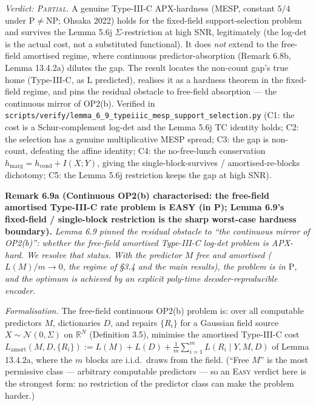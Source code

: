 \documentclass[
]{article}
\begin{document}
\emph{Verdict: \textsc{Partial}.} A genuine Type-III-C APX-hardness (MESP,
constant $5/4$ under $\mathrm P\neq\mathrm{NP}$; Ohsaka 2022) holds for the
fixed-field support-selection problem and survives the Lemma 5.6j
$\Sigma$-restriction at high SNR, legitimately (the log-det is the actual
cost, not a substituted functional). It does \emph{not} extend to the
free-field amortised regime, where continuous predictor-absorption (Remark
6.8b, Lemma 13.4.2a) dilutes the gap. The result locates the non-count gap's
true home (Type-III-C, as L predicted), realises it as a hardness theorem in
the fixed-field regime, and pins the residual obstacle to free-field
absorption --- the continuous mirror of OP2(b). Verified in
\texttt{scripts/verify/lemma\_6\_9\_typeiiic\_mesp\_support\_selection.py}
(C1: the cost is a Schur-complement log-det and the Lemma 5.6j TC identity
holds; C2: the selection has a genuine multiplicative MESP spread; C3: the
gap is non-count, defeating the affine identity; C4: the no-free-lunch
conservation $h_{\mathrm{marg}}=h_{\mathrm{cond}}+I(X;Y)$, giving the
single-block-survives / amortised-re-blocks dichotomy; C5: the Lemma 5.6j
restriction keeps the gap at high SNR).

\textbf{Remark 6.9a (Continuous OP2(b) characterised: the free-field
amortised Type-III-C rate problem is EASY (in P); Lemma 6.9's fixed-field /
single-block restriction is the sharp worst-case hardness boundary).}
\emph{Lemma 6.9 pinned the residual obstacle to ``the continuous mirror of
OP2(b)'': whether the free-field amortised Type-III-C log-det problem is
APX-hard. We resolve that status. With the predictor $M$ free and amortised
($L(M)/m\to0$, the regime of \S 3.4 and the main results), the problem is in
$\mathrm P$, and the optimum is achieved by an explicit poly-time
decoder-reproducible encoder.}

\emph{Formalisation.} The free-field continuous OP2(b) problem is: over all
computable predictors $M$, dictionaries $D$, and repairs $\{R_i\}$ for a
Gaussian field source $X\sim\mathcal N(0,\Sigma)$ on $\mathbb R^N$
(Definition 3.5), minimise the amortised Type-III-C cost
$L_{\mathrm{amort}}(M,D,\{R_i\}) := L(M)+L(D)+\frac1m\sum_{i=1}^m L(R_i\mid
Y,M,D)$ of Lemma 13.4.2a, where the $m$ blocks are i.i.d.\ draws from the
field. (``Free $M$'' is the most permissive class --- arbitrary computable
predictors --- so an \textsc{Easy} verdict here is the strongest form: no
restriction of the predictor class can make the problem harder.)
\end{document}
